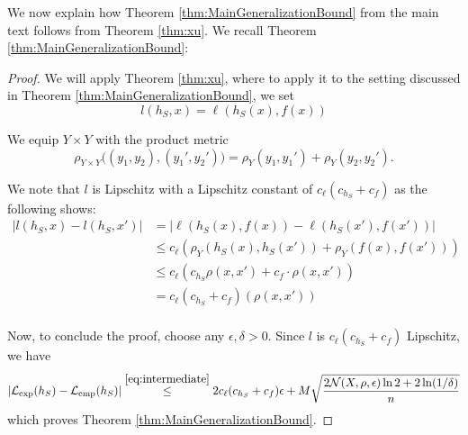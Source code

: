 \documentclass{article}
\begin{document}
We now explain how Theorem \ref{thm:MainGeneralizationBound} from the main text follows from Theorem \ref{thm:xu}. We recall Theorem \ref{thm:MainGeneralizationBound}:
\MainGeneralizationBound*
\begin{proof}
We will apply Theorem \ref{thm:xu}, where to apply it to
the setting discussed in Theorem \ref{thm:MainGeneralizationBound}, we set
$$l(h_S,x)=\ell(h_S(x),f(x))$$

We equip $Y\times Y$ with the product metric
\[
\rho_{Y\times Y}\big((y_1,y_2),(y_1',y_2')\big)
=
\rho_Y(y_1,y_1')+\rho_Y(y_2,y_2').
\]

We note that $l$ is Lipschitz with a Lipschitz constant of $c_\ell (c_{h_S}+c_f)$ as the following shows: 
\begin{align*}
|l(h_S,x)-l(h_S,x')|&=|\ell(h_S(x),f(x))-\ell(h_S(x'),f(x'))|\\
&\leq c_\ell \left( \rho_Y(h_S(x),h_S(x'))+\rho_Y(f(x),f(x'))  \right)\\
&\leq c_\ell \left( c_{h_S}\rho(x,x')+c_f\cdot \rho(x,x')  \right)\\
& = c_\ell (c_{h_S}+c_f)( \rho(x,x'))\\
\end{align*}

Now, to conclude the proof, choose any $\epsilon,\delta>0$. Since $l$ is $c_\ell (c_{h_S}+c_f)$ Lipschitz, we have 
\begin{align*}
|\mathcal{L}_{\mathrm{exp}}(h_S) - \mathcal{L}_{\mathrm{emp}}(h_S)|
&\stackrel{\eqref{eq:intermediate}}{\le} 2c_\ell (c_{h_S}+c_f) \epsilon + M \sqrt{\frac{2\mathcal{N}( X, \rho, \epsilon) \ln 2 + 2 \ln(1/\delta)}{n}}\\
\end{align*}
which proves Theorem \ref{thm:MainGeneralizationBound}.
\end{proof}
\end{document}
